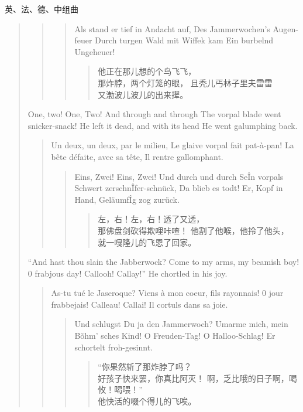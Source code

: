 \begin{dialog}{英、法、德、中组曲}
\begin{verse}
\begin{verse}
    \begin{verse}
    Als stand er tief in Andacht auf,
    Des Jammerwochen's Augen-feuer
    Durch turgen Wald mit Wiffek kam
    Ein burbelnd Ungeheuer!

      \begin{verse}
      他正在那儿想的个鸟飞飞，\\
      那炸脖，两个灯笼的眼，
      且秃儿丐林子里夫雷雷\\
      又渤波儿波儿的出来撵。
      \end{verse}
    \end{verse}
  \end{verse}

One, two! One, Two! And through and through
The vorpal blade went snicker-snack!
He left it dead, and with its head
He went galumphing back.

  \begin{verse}
  Un deux, un deux, par le milieu,
  Le glaive vorpal fait pat-à-pan!
  La bête défaite, avec sa tête,
  Il rentre gallomphant.

    \begin{verse}
    Eins, Zwei! Eins, Zwei! Und durch und durch
    SeÎn vorpals Schwert zerschnÎfer-schnück,
    Da blieb es todt! Er, Kopf in Hand,
    GeläumfÎg zog zurück.

      \begin{verse}
      左，右！左，右！透了又透，\\
      那佛盘剑砍得欺哩咔喳！
      他割了他喉，他拎了他头，\\
      就一嘎隆儿的飞恩了回家。
      \end{verse}
    \end{verse}
  \end{verse}

``And hast thou slain the Jabberwock?
Come to my arms, my beamish boy!
0 frabjous day! Callooh! Callay!''
He chortled in his joy.

  \begin{verse}
  \guillemotleft As-tu tué le Jaseroque?
  Viens à mon coeur, fils rayonnais!
  0 jour frabbejais! Calleau! Callai!\guillemotright
  Il cortuls dans sa joie.

    \begin{verse}
    \guillemotright Und schlugst Du ja den Jammerwoch?
    Umarme mich, mein Bõhm' sches Kind!
    O Freuden-Tag! O Halloo-Schlag!\guillemotleft
    Er schortelt froh-gesinnt.

      \begin{verse}
      “你果然斩了那炸脖了吗？\\
      好孩子快来罢，你真比阿灭！
      啊，乏比哦的日子啊，喝攸！喝喂！”\\
      他快活的啜个得儿的飞唉。
      \end{verse}
    \end{verse}
  \end{verse}


\end{verse}
\end{dialog}
